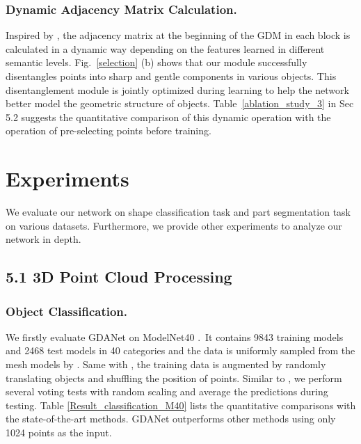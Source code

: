 \documentclass[letterpaper]{article} \usepackage{aaai21}  \usepackage{times}  \usepackage{helvet} \usepackage{courier}  \usepackage[hyphens]{url}  \usepackage{graphicx} \urlstyle{rm} \def\UrlFont{\rm}  \usepackage{natbib}  \usepackage{caption} \frenchspacing  \setlength{\pdfpagewidth}{8.5in}  \setlength{\pdfpageheight}{11in}  \usepackage{color}
\begin{document}
\subsubsection{Dynamic Adjacency Matrix Calculation.}
Inspired by \cite{Wang:2019:DGC:3341165.3326362}, the adjacency matrix at the beginning of the GDM in each block is calculated in a dynamic way depending on the features learned in different semantic levels. Fig.~\ref{selection} (b) shows that our module successfully disentangles points into sharp and gentle components in various objects. This disentanglement module is jointly optimized during learning to help the network better model the geometric structure of objects. Table~\ref{ablation_study_3} in Sec 5.2 suggests the quantitative comparison of this dynamic operation with the operation of pre-selecting points before training.


\section{Experiments}

We evaluate our network on shape classification task and part segmentation task on various datasets. Furthermore, we provide other experiments to analyze our network in depth.

\subsection{5.1 3D Point Cloud Processing}\label{5.1} 
\subsubsection{Object Classification.}
We firstly evaluate GDANet on ModelNet40 \cite{Wu_2015_CVPR}.~It contains 9843 training models and 2468 test models in 40 categories and the data is uniformly sampled from the mesh models by \cite{Qi_2017_CVPR}. Same with \cite{Wang:2019:DGC:3341165.3326362}, the training data is augmented by randomly translating objects and shuffling the position of points. Similar to \cite{Qi_2017_CVPR,NIPS2017_7095}, we perform several voting tests with random scaling and average the predictions during testing. Table \ref{Result_classification_M40} lists the quantitative comparisons with the state-of-the-art methods. GDANet outperforms other methods using only 1024 points as the input.  
\end{document}
